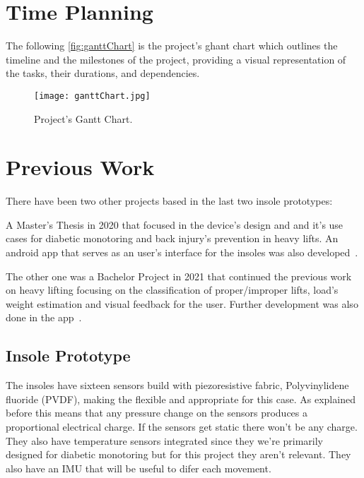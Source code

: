 \newpage
\section{Time Planning}
\label{sec:time_planning}

The following \autoref{fig:ganttChart} is the project's ghant chart which outlines the timeline and the milestones of the project, providing a visual representation of the tasks, their durations, 
and dependencies.

\begin{figure}[htbp]
    \centering
    \texttt{[image: ganttChart.jpg]}
    \caption{Project's Gantt Chart.}
    \label{fig:ganttChart}
\end{figure}

\section{Previous Work}
\label{sec:previous_work}

There have been two other projects based in the last two insole prototypes: 

A Master's Thesis in 2020 that focused in the device's design and and it's use cases for 
diabetic monotoring and back injury's prevention in heavy lifts. An android app that serves as an user's interface for the insoles was also developed~\cite{masterInsole}. 

The other one was a Bachelor Project in 2021 that continued the previous work on heavy lifting focusing on the classification of proper/improper lifts, 
load's weight estimation and visual feedback for the user. Further development was also done in the app~\cite{bachelorInsole}. 

\subsection{Insole Prototype}
\label{ssub:insoleProt}

The insoles have sixteen sensors build with piezoresistive fabric, Polyvinylidene fluoride (PVDF), making the flexible and appropriate for this case. 
As explained before this means that any pressure change on the sensors produces a proportional electrical charge. If the sensors get static there won't be any charge.
They also have temperature sensors integrated since they we're primarily designed for diabetic monotoring but for this project they aren't relevant. They also have an IMU that will 
be useful to difer each movement.

